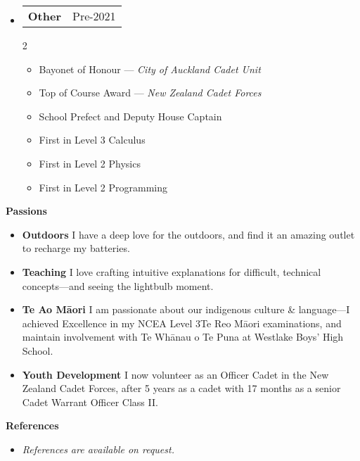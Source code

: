 \documentclass[11pt,a4paper]{article}[leftmargin=*]
\makeatletter
\def \entryspacing {-0pt}
\def \bulletstylei {\faAngleRight\hspace{-4.5pt}}
\renewcommand{\section}[2]{\vspace{5pt}
  \colorbox{secondary}{\color{white}\raggedbottom\normalsize\textbf{{#1}{\hspace{2pt}#2\hspace{4pt}}}}
}
\newcommand{\resumeEntryStart}{\begin{itemize}[leftmargin=2.5mm]}
\newcommand{\resumeEntryEnd}{\end{itemize}\vspace{\entryspacing}}
\newcommand{\resumeItemListStartColumns}[2][-0.5]{\vspace*{#1\multicolsep}
\begin{multicols}{#2}\begin{itemize}[leftmargin=4.5mm]}
\newcommand{\resumeItemListEndColumns}[1][-1]{\end{itemize}\end{multicols}\vspace*{#1\multicolsep}}
\newcommand{\resumeItem}[2][\bulletstylei]{
  \item[\small#1]\small{
    {#2 \vspace{-2pt}}
  }
}
\newcommand{\resumeEntryTSDL}[4]{
  \vspace{-1pt}\item[]
    \begin{tabularx}{0.97\textwidth}{X@{\hspace{60pt}}r}
      \textbf{\color{primary}#1} & {\firabook\color{accent}\small#2} \\
      \textit{\color{accent}\small#3} & \textit{\color{accent}\small#4} \\
    \end{tabularx}\vspace{-6pt}
}
\newcommand{\resumeEntryTD}[2]{
  \vspace{-1pt}\item[]
    \begin{tabularx}{0.97\textwidth}{X@{\hspace{60pt}}r}
      \textbf{\color{primary}#1} & {\firabook\color{accent}\small#2} \\
    \end{tabularx}\vspace{-6pt}
}
\newcommand{\resumeEntryS}[2]{
  \item[]\small{
    \textbf{\color{primary}#1 }{ #2 \vspace{-4pt}}
  }
}
\newcommand{\resumeEntryE}[1]{
  \item[]\small{
    \resumeIt{\small#1 \vspace{-4pt}}
  }\\
}
\newcommand{\resumeEntryP}[1]{
  \item[]\small{
    #1 \vspace{-4pt}
  }\\
}
\newcommand{\resumeIt}[1]{\textit{\color{accent}#1}}
\newcommand{\resumeBf}[1]{\small\textbf{\color{halfbold}#1}}
\makeatother
\begin{document}
\resumeEntryStart
\resumeEntryTD
{Other}{Pre-2021}
\resumeItemListStartColumns{2}
\resumeItem {Bayonet of Honour --- \resumeIt{City of Auckland Cadet Unit}}
\resumeItem {Top of Course Award --- \resumeIt{New Zealand Cadet Forces}}
\resumeItem {School Prefect and Deputy House Captain}
\resumeItem {First in Level 3 Calculus}
\resumeItem {First in Level 2 Physics}
\resumeItem {First in Level 2 Programming}
\resumeItemListEndColumns
\resumeEntryEnd


\section{\faUserCircle}{Passions}

\resumeEntryStart
\resumeEntryS
{Outdoors}
{
  I have a deep love for the outdoors, and find it an amazing outlet to recharge my batteries.
}

\resumeEntryS
{Teaching}
{
  I love crafting intuitive explanations for difficult, technical concepts---and seeing the lightbulb moment.
}

\resumeEntryS
{Te Ao Māori}
{
  I am passionate about our indigenous culture \& language---I achieved Excellence in my NCEA Level 3\break Te Reo Māori examinations, and maintain involvement with Te Whānau o Te Puna at Westlake Boys' High School.
}

\resumeEntryS
{Youth Development}
{
  I now volunteer as an Officer Cadet in the New Zealand Cadet Forces, after 5 years as a cadet with 17 months as a senior Cadet Warrant Officer Class II.
}
\resumeEntryEnd


\section{\faUserCheck}{References}

\resumeEntryStart
\resumeEntryE{
  References are available on request.
}
\resumeEntryEnd



\end{document}
